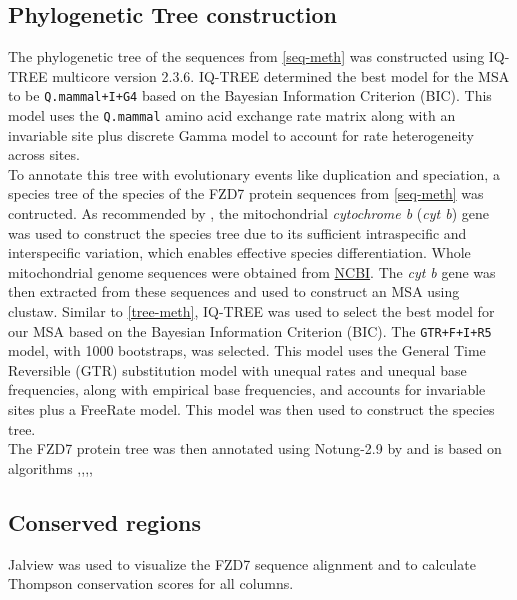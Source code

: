 \documentclass[11pt, a4paper]{article}
\begin{document}
\subsection{Phylogenetic Tree construction}
\label{tree-meth}
The phylogenetic tree of the sequences from \autoref{seq-meth} was constructed using IQ-TREE multicore version 2.3.6. IQ-TREE determined the best model for the MSA to be \texttt{Q.mammal+I+G4} based on the Bayesian Information Criterion (BIC). This model uses the \texttt{Q.mammal} amino acid exchange rate matrix \cite{Minh2021-yc} along with an invariable site plus discrete Gamma model to account for rate heterogeneity across sites. \\
To annotate this tree with evolutionary events like duplication and speciation, a species tree of the species of the FZD7 protein sequences from \autoref{seq-meth} was contructed. As recommended by \cite{Tobe2010-bi}, the mitochondrial \textit{cytochrome b} (\textit{cyt b}) gene was used to construct the species tree due to its sufficient intraspecific and interspecific variation, which enables effective species differentiation. Whole mitochondrial genome sequences were obtained from \href{https://www.ncbi.nlm.nih.gov/}{NCBI}. The \textit{cyt b} gene was then extracted from these sequences and used to construct an MSA using clustaw. Similar to \autoref{tree-meth}, IQ-TREE was used to select the best model for our MSA based on the Bayesian Information Criterion (BIC). The \texttt{GTR+F+I+R5} model, with 1000 bootstraps, was selected. This model uses the General Time Reversible (GTR) substitution model with unequal rates and unequal base frequencies, along with empirical base frequencies, and accounts for invariable sites plus a FreeRate model. This model was then used to construct the species tree. \\
The FZD7 protein tree was then annotated using Notung-2.9 by \cite{Stolzer_Lai_Vernot_Darby_Xu_Goldman_Sathaye_Durand} and is based on algorithms \cite{Stolzer2012},\cite{Darby2016},\cite{Durand2006},\cite{Lai2017},\cite{Vernot2008}
\subsection{Conserved regions}
Jalview \cite{Jalview2024} was used to visualize the FZD7 sequence alignment and to calculate Thompson conservation scores \cite{Thompson1999} for all columns.
\end{document}
